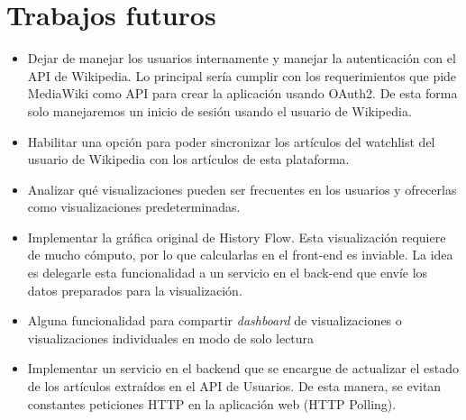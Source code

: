 \section{Trabajos futuros}

\begin{itemize}
    \item Dejar de manejar los usuarios internamente y manejar la autenticación con el API de Wikipedia. Lo principal sería cumplir con los requerimientos que pide MediaWiki como API para crear la aplicación usando OAuth2. De esta forma solo manejaremos un inicio de sesión usando el usuario de Wikipedia.
    
    \item Habilitar una opción para poder sincronizar los artículos del watchlist del usuario de Wikipedia con los artículos de esta plataforma.
    
    \item Analizar qué visualizaciones pueden ser frecuentes en los usuarios y ofrecerlas como visualizaciones predeterminadas.
    
    \item Implementar la gráfica original de History Flow. Esta visualización requiere de mucho cómputo, por lo que calcularlas en el front-end es inviable. La idea es delegarle esta funcionalidad a un servicio en el back-end que envíe los datos preparados para la visualización.
    
    \item Alguna funcionalidad para compartir \textit{dashboard} de visualizaciones o visualizaciones individuales en modo de solo lectura
    
    \item Implementar un servicio en el backend que se encargue de actualizar el estado de los artículos extraídos en el API de Usuarios. De esta manera, se evitan constantes peticiones HTTP en la aplicación web (HTTP Polling).
\end{itemize}

